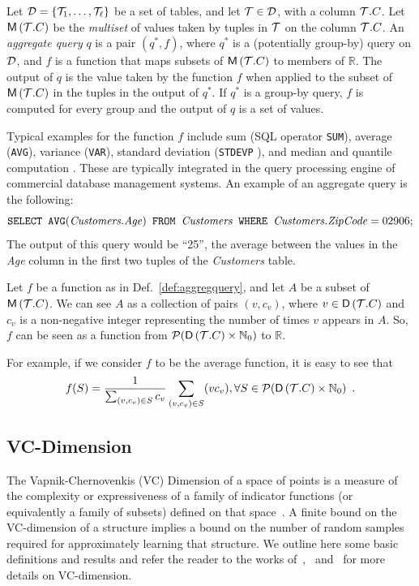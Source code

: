\begin{definition}\label{def:aggregquery}
  Let ${\cal D}=\{{\cal T}_1,\dotsc,{\cal T}_\ell\}$ be a set of tables, and let ${\cal T}\in {\cal D}$,
  with a column ${\cal T}.C$. Let $\mathsf{M}\left({\cal T}.C\right)$ be the \emph{multiset} of
  values taken by tuples in ${\cal T}$ on the column ${\cal T}.C$. An \emph{aggregate
  query} $q$ is a pair $(q^*,f)$, where $q^*$ is a (potentially group-by) query
  on ${\cal D}$, and $f$ is a function that maps subsets of $\mathsf{M}\left({\cal T}.C\right)$ to members
  of $\mathbb{R}$. The output of $q$ is the value taken by the function $f$ when
  applied to the subset of $\mathsf{M}\left({\cal T}.C\right)$ in the tuples in the output of $q^*$. If
  $q^*$ is a group-by query, $f$ is computed for every group and the output of
  $q$ is a set of values.  
\end{definition}
Typical examples for the function $f$ include sum (SQL operator \texttt{SUM}),
average (\texttt{AVG}), variance (\texttt{VAR}), standard
deviation (\texttt{STDEVP} ), and median
and quantile computation .
These are typically integrated in the query processing engine of commercial
database management systems. An example of an aggregate query is the following:
\[
\text{\texttt{SELECT }} \text{\texttt{AVG}}(\text{\emph{Customers.Age}}) \text{\texttt{ FROM }}
\text{\emph{Customers}} \text{\texttt{ WHERE }} \text{\emph{Customers.ZipCode}} = 02906;
\]
The output of this query would be ``25'', the average between the values in the
\emph{Age} column in the first two tuples of the \emph{Customers} table.

\begin{fact}\label{fact:aggregquery}
  Let $f$ be a function as in Def.~\ref{def:aggregquery}, and let $A$ be a 
  subset of $\mathsf{M}\left({\cal T}.C\right)$. We can see $A$ as a collection of pairs
  $(v,c_v)$,
  where $v\in \mathsf{D}\left({\cal T}.C\right)$ and $c_v$ is a non-negative integer representing the number of
  times $v$ appears in $A$. So, $f$ can be seen as a function from
  $\mathcal{P}(\mathsf{D}\left({\cal T}.C\right)\times\mathbb{N}_0)$ to $\mathbb{R}$.
\end{fact}
For example, if we consider $f$ to be the average function, it is easy to see
that
\[
f(S)=\frac{1}{\sum_{(v,c_v)\in S} c_v}\sum_{(v,c_v)\in S}(vc_v), \forall
S\in\mathcal{P}(\mathsf{D}\left({\cal T}.C\right)\times\mathbb{N}_0)\enspace.\]

\subsection{VC-Dimension}\label{sec:prelvcdim}
The Vapnik-Chernovenkis (VC) Dimension of a space of points is a measure of the
complexity or expressiveness of a family of indicator functions (or equivalently
a family of subsets) defined on that space~\cite{VapnikC71}. A finite bound on
the VC-dimension of a structure implies a bound on the number of random samples
required for approximately learning that structure. We outline here some basic
definitions and results and refer the reader to the works
of~\citet[Sect.~14.4]{AlonS08},~\citet{MohriRT12} and~\citet{Vapnik99} for more details
on VC-dimension. %

